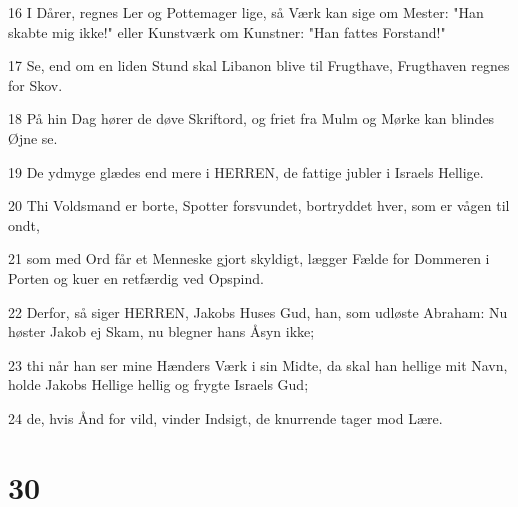 \par 16 I Dårer, regnes Ler og Pottemager lige, så Værk kan sige om Mester: "Han skabte mig ikke!" eller Kunstværk om Kunstner: "Han fattes Forstand!"
\par 17 Se, end om en liden Stund skal Libanon blive til Frugthave, Frugthaven regnes for Skov.
\par 18 På hin Dag hører de døve Skriftord, og friet fra Mulm og Mørke kan blindes Øjne se.
\par 19 De ydmyge glædes end mere i HERREN, de fattige jubler i Israels Hellige.
\par 20 Thi Voldsmand er borte, Spotter forsvundet, bortryddet hver, som er vågen til ondt,
\par 21 som med Ord får et Menneske gjort skyldigt, lægger Fælde for Dommeren i Porten og kuer en retfærdig ved Opspind.
\par 22 Derfor, så siger HERREN, Jakobs Huses Gud, han, som udløste Abraham: Nu høster Jakob ej Skam, nu blegner hans Åsyn ikke;
\par 23 thi når han ser mine Hænders Værk i sin Midte, da skal han hellige mit Navn, holde Jakobs Hellige hellig og frygte Israels Gud;
\par 24 de, hvis Ånd for vild, vinder Indsigt, de knurrende tager mod Lære.

\chapter{30}


